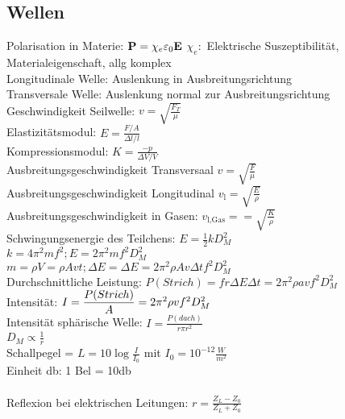 \documentclass[fs, footer]{latex4ei}
\begin{document}
\begin{multicols*}{4}
\section{Wellen}
Polarisation in Materie: $\textbf{P} = \chi_e\varepsilon_0\textbf{E}$ $\chi_e:$ Elektrische Suszeptibilität, Materialeigenschaft, allg komplex\\
Longitudinale Welle: Auslenkung in Ausbreitungsrichtung\\
Transversale Welle: Auslenkung normal zur Ausbreitungsrichtung\\
Geschwindigkeit Seilwelle: $v = \sqrt{\frac{F_T}{\mu}}$\\ %
Elastizitätsmodul: $E = \frac{F / A}{\Delta l / l}$\\
Kompressionsmodul: $K = \frac{-p}{\Delta V / V}$\\
Ausbreitungsgeschwindigkeit Transversaal $v = \sqrt{\frac{F}{\mu}}$\\
Ausbreitungsgeschwindigkeit Longitudinal $v_\text{l} = \sqrt{\frac{E}{\rho}}$\\
Ausbreitungsgeschwindigkeit in Gasen: $v_\text{l,Gas} =  = \sqrt{\frac{K}{\rho}}$\\
Schwingungsenergie des Teilchens: $E = \frac{1}{2}kD_M^2$\\
$k = 4\pi ^2mf^2; E = 2\pi^2mf^2D_M^2$\\
$m = \rho V = \rho A v t; \Delta E = \Delta E = 2\pi^2 \rho A v \Delta tf^2D_M^2$\\
Durchschnittliche Leistung: $P (Strich) = fr{\Delta E}{\Delta t} = 2\pi ^2 \rho a v f^2 D_M^2$\\

Intensität: $ I = \dfrac{P (Strich)}{A} = 2\pi^2\rho v f^2D_M^2$\\
Intensität sphärische Welle: $I = \frac{P (dach)}{r\pi r^2}$\\
$D_M \propto \frac{1}{r}$\\
Schallpegel = $L = 10\log{\frac{I}{I_0}}$ mit $I_0 = 10^{-12}\frac{W}{m^2}$\\
Einheit db: 1 Bel = 10db\\
\\
Reflexion bei elektrischen Leitungen: $ r = \frac{Z_L-Z_0}{Z_L+Z_0}$\\


\end{multicols*}
\end{document}
